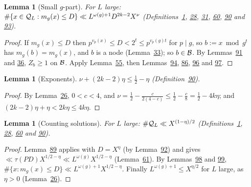 \documentclass[11pt]{article}
\newcounter{hffc}
\theoremstyle{definition}\newtheorem{hffdef}[hffc]{Definition}
\theoremstyle{plain}\newtheorem{hfflem}[hffc]{Lemma}\newtheorem{hffthm}[hffc]{Theorem}
\theoremstyle{remark}\newtheorem{hffrem}[hffc]{Remark}
\newcommand{\hffcost}{}
\newcommand{\setcost}[1]{\renewcommand{\hffcost}{#1}}
\begin{document}
\begin{hfflem}[Small $g$-part]\label{L:smallg}
For $L$ large: $\#\{x\in\mathcal{Q}_L:m_g(x)\le D\}\ll L^{\omega(g)+1}D^{2k-2}X^\nu$ (Definitions~\hyperref[D:conv]{1}, \hyperref[D:pal]{28}, \hyperref[D:node]{31}, \hyperref[D:gpart]{60}, \hyperref[D:par]{90} and \hyperref[D:setB]{93}).
\par\nopagebreak{}
\end{hfflem}
\begin{proof}\setcost{length 153/300}If $m_g(x)\le D$ then $p^{v_p(x)}\le D<2^t\le p^{v_p(g)t}$ for $p\mid g$, so $b:=x\bmod g^t$ has $m_g(b)=m_g(x)$, and $b$ is a node (Lemma~\hyperref[L:tree]{33}); so $b\in\mathcal{B}$. By Lemmas~\hyperref[L:adm]{91} and \hyperref[L:nonempty]{36}, $Z_b\ge1$ on $\mathcal{B}$. Apply Lemma~\hyperref[L:red]{55}, then Lemmas~\hyperref[L:main]{94}, \hyperref[L:E]{86}, \hyperref[L:err1]{96} and \hyperref[L:err2]{97}.
\end{proof}

\begin{hfflem}[Exponents]\label{L:expo}
$\nu+(2k-2)\eta\le\frac12-\eta$ (Definition~\hyperref[D:par]{90}).
\par\nopagebreak{}
\end{hfflem}
\begin{proof}\setcost{length 66/300}By Lemma~\hyperref[L:saving]{26}, $0<c<4$, and $\nu=\frac12-\frac c{2(4-c)}\le\frac12-\frac c8=\frac12-4k\eta$; and $(2k-2)\eta+\eta<2k\eta\le4k\eta$.
\end{proof}

\begin{hfflem}[Counting solutions]\label{L:final}
For $L$ large: $\#\mathcal{Q}_L\ll X^{(1-\eta)/2}$ (Definitions~\hyperref[D:conv]{1}, \hyperref[D:pal]{28}, \hyperref[D:gpart]{60} and \hyperref[D:par]{90}).
\par\nopagebreak{}
\end{hfflem}
\begin{proof}\setcost{length 162/300}Lemma~\hyperref[L:largeg]{89} applies with $D=X^\eta$ (by Lemma~\hyperref[L:admD]{92}) and gives $\ll\tau(PD)X^{1/2-\eta}\ll L^{\omega(g)}X^{1/2-\eta}$ (Lemma~\hyperref[L:tau]{61}). By Lemmas~\hyperref[L:smallg]{98} and \hyperref[L:expo]{99}, $\#\{x:m_g(x)\le D\}\ll L^{\omega(g)+1}X^{1/2-\eta}$. Finally $L^{\omega(g)+1}\le X^{\eta/2}$ for $L$ large, as $\eta>0$ (Lemma~\hyperref[L:saving]{26}).
\end{proof}
\end{document}
